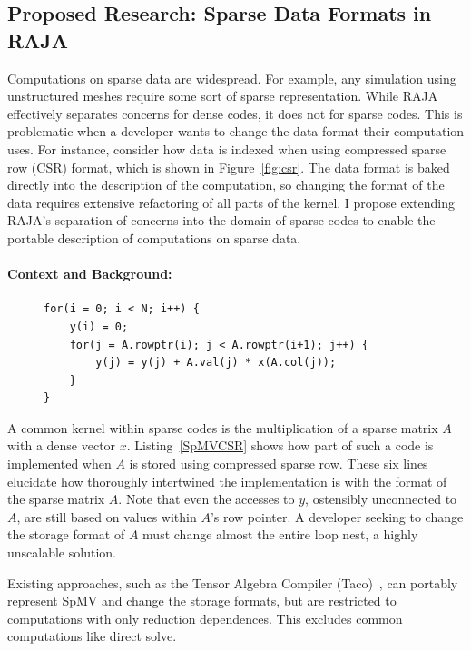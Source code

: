 \documentclass{article}
\begin{document}
\subsection{Proposed Research: Sparse Data Formats in RAJA}
\label{Sec:Work3}
Computations on sparse data are widespread. 
For example, any simulation using unstructured meshes require some sort of sparse representation.
While RAJA effectively separates concerns for dense codes, it does not for sparse codes.
This is problematic when a developer wants to change the data format their computation uses.
For instance, consider how data is indexed when using compressed sparse row (CSR) format, which is shown in Figure~\ref{fig:csr}. 
The data format is baked directly into the description of the computation, so changing the format of the data requires extensive refactoring of all parts of the kernel.
I propose extending RAJA's separation of concerns into the domain of sparse codes to enable the portable description of computations on sparse data.


\paragraph{Context and Background:}
\begin{figure}

\begin{lstlisting}[caption={CSR-stored sparse matrix vector multiplication},label={SpMVCSR}]
for(i = 0; i < N; i++) {
    y(i) = 0;
    for(j = A.rowptr(i); j < A.rowptr(i+1); j++) {
        y(j) = y(j) + A.val(j) * x(A.col(j));
    }
}
\end{lstlisting}
\end{figure}

A common kernel within sparse codes is the multiplication of a sparse matrix $A$ with a dense vector $x$.
Listing~\ref{SpMVCSR} shows how part of such a code is implemented when $A$ is stored using compressed sparse row.
These six lines elucidate how thoroughly intertwined the implementation is with the format of the sparse matrix $A$.
Note that even the accesses to $y$, ostensibly unconnected to $A$, are still based on values within $A$'s row pointer.
A developer seeking to change the storage format of $A$ must change almost the entire loop nest, a highly unscalable solution.

Existing approaches, such as the Tensor Algebra Compiler (Taco)~\cite{kjolstad2017tensor}, can portably represent SpMV and change the storage formats, but are restricted to computations with only reduction dependences.
This excludes common computations like direct solve.
\end{document}
